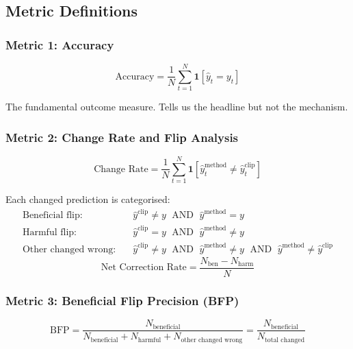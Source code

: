 \documentclass[12pt,a4paper]{article}
\newcommand{\1}{\mathbf{1}}
\begin{document}
\subsection{Metric Definitions}

\subsubsection{Metric 1: Accuracy}
\begin{equation}
  \text{Accuracy} = \frac{1}{N}\sum_{t=1}^N \mathbf{1}\!\left[\hat{y}_t = y_t\right]
\end{equation}

The fundamental outcome measure. Tells us the headline but not the mechanism.

\subsubsection{Metric 2: Change Rate and Flip Analysis}

\begin{equation}
  \text{Change Rate} = \frac{1}{N}\sum_{t=1}^N \mathbf{1}\!\left[\hat{y}_t^{\text{method}} \neq \hat{y}_t^{\text{clip}}\right]
\end{equation}

Each changed prediction is categorised:
\begin{align}
  \text{Beneficial flip:} &\quad \hat{y}^{\text{clip}} \neq y \;\text{ AND }\; \hat{y}^{\text{method}} = y \\
  \text{Harmful flip:} &\quad \hat{y}^{\text{clip}} = y \;\text{ AND }\; \hat{y}^{\text{method}} \neq y \\
  \text{Other changed wrong:} &\quad \hat{y}^{\text{clip}} \neq y \;\text{ AND }\; \hat{y}^{\text{method}} \neq y \;\text{ AND }\; \hat{y}^{\text{method}} \neq \hat{y}^{\text{clip}}
\end{align}
\begin{equation}
  \text{Net Correction Rate} = \frac{N_{\text{ben}} - N_{\text{harm}}}{N}
\end{equation}

\subsubsection{Metric 3: Beneficial Flip Precision (BFP)}
\begin{equation}
  \text{BFP} = \frac{N_{\text{beneficial}}}{N_{\text{beneficial}} + N_{\text{harmful}} + N_{\text{other changed wrong}}}
             = \frac{N_{\text{beneficial}}}{N_{\text{total changed}}}
  \label{eq:bfp}
\end{equation}
\end{document}
